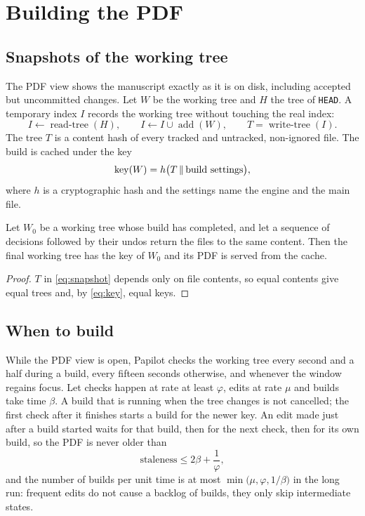 \section{Building the PDF}
\label{sec:build}

\subsection{Snapshots of the working tree}

The PDF view shows the manuscript exactly as it is on disk, including accepted
but uncommitted changes. Let $W$ be the working tree and $H$ the tree of
\texttt{HEAD}. A temporary index $I$ records the working tree without touching
the real index:
\begin{equation}
  I \leftarrow \operatorname{read-tree}(H), \qquad
  I \leftarrow I \cup \operatorname{add}(W), \qquad
  T = \operatorname{write-tree}(I) .
  \label{eq:snapshot}
\end{equation}
The tree $T$ is a content hash of every tracked and untracked, non-ignored
file. The build is cached under the key
\begin{equation}
  \operatorname{key}(W) = h\bigl(T \,\|\, \text{build settings}\bigr),
  \label{eq:key}
\end{equation}
where $h$ is a cryptographic hash and the settings name the engine and the
main file.

\begin{proposition}
\label{prop:undo-build}
Let $W_0$ be a working tree whose build has completed, and let a sequence of
decisions followed by their undos return the files to the same content. Then
the final working tree has the key of $W_0$ and its PDF is served from the
cache.
\end{proposition}

\begin{proof}
$T$ in \cref{eq:snapshot} depends only on file contents, so equal contents give
equal trees and, by \cref{eq:key}, equal keys.
\end{proof}

\subsection{When to build}

While the PDF view is open, Papilot checks the working tree every second and
a half during a build, every fifteen seconds otherwise, and whenever the window
regains focus. Let checks happen at rate at least $\varphi$, edits at rate
$\mu$ and builds take time $\beta$. A build that is running when the tree
changes is not cancelled; the first check after it finishes starts a build for
the newer key. An edit made just after a build started waits for that build,
then for the next check, then for its own build, so the PDF is never older than
\begin{equation}
  \text{staleness} \le 2\beta + \frac{1}{\varphi} ,
  \label{eq:staleness}
\end{equation}
and the number of builds per unit time is at most
$\min\bigl(\mu, \varphi, 1/\beta\bigr)$ in the long run: frequent edits do not
cause a backlog of builds, they only skip intermediate states.

